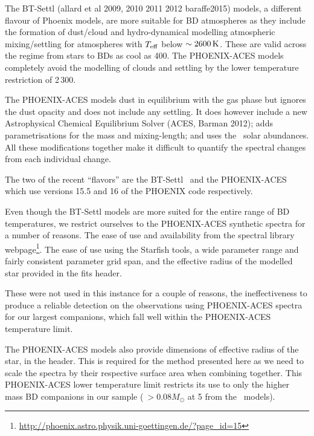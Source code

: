 \label{bt-setll}
The {BT-Settl} (allard et al 2009, 2010 2011 2012 baraffe2015) models, a different flavour of Phoenix models, are more suitable for {BD} atmospheres as they include the formation of dust/cloud and hydro-dynamical modelling atmospheric mixing/settling for atmospheres with \(T_{\mathrm{eff}}{}\) below \(\sim2600\,\si{\kelvin}{}\).
These are valid across the regime from stars to BDs as cool as 400\K{}.
The {PHOENIX-ACES} models completely avoid the modelling of clouds and settling by the lower temperature restriction of 2\,300\K{}.

The {PHOENIX-ACES} models dust in equilibrium with the gas phase but ignores the dust opacity and does not include any settling.
It does however include a new Astrophysical Chemical Equilibrium Solver (ACES,
Barman 2012); adds parametrisations for the mass and mixing-length; and uses the~\citet{asplund_chemical_2009} solar abundances.
All these modifications together make it difficult to quantify the spectral changes from each individual change.

The two of the recent ``flavors'' are the {BT-Settl}~\citep{allard_model_2010, baraffe_new_2015} and the {PHOENIX-ACES}~\citep{husser_new_2013} which use versions 15.5 and 16 of the {PHOENIX} code respectively.

Even though the {BT-Settl} models are more suited for the entire range of {BD} temperatures, we restrict ourselves to the {PHOENIX-ACES} synthetic spectra for a number of reasons.
The ease of use and availability from the spectral library webpage\footnote{\url{http://phoenix.astro.physik.uni-goettingen.de/?page_id=15}}.
The ease of use using the Starfish tools, a wide parameter range and fairly consistent parameter grid span, and the effective radius of the modelled star provided in the fits header.

These were not used in this instance for a couple of reasons, the ineffectiveness to produce a reliable detection on the observations using  {PHOENIX-ACES}  spectra for our largest companions, which fall well within the  {PHOENIX-ACES}  temperature limit.

The {PHOENIX-ACES} models also provide dimensions of effective radius of the star, in the header.
This is required for the method presented here as we need to scale the spectra by their respective surface area when combining together.
This {PHOENIX-ACES} lower temperature limit restricts its use to only the higher mass {BD} companions in our sample (\(~>0.08 M_{\odot}\) at 5\Gyr{} from the~\citet{baraffe_evolutionary_2003} models).


